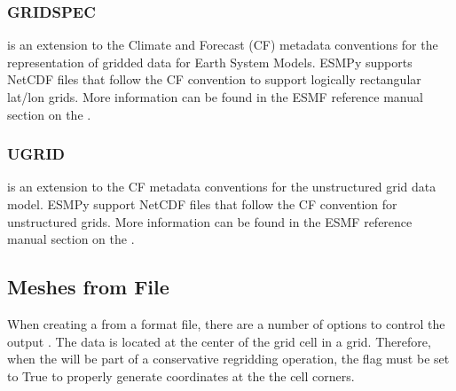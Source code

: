 \documentclass[letterpaper,10pt,english]{sphinxmanual}
\begin{document}
\subsubsection{GRIDSPEC}
\label{\detokenize{api:gridspec}}\label{\detokenize{api:id5}}
{\hyperref[\detokenize{FileFormat:ESMF.api.constants.FileFormat.GRIDSPEC}]{}} is an extension to the Climate and Forecast (CF) metadata
conventions for the representation of gridded data for Earth System
Models.  ESMPy supports NetCDF files that follow the CF {\hyperref[\detokenize{FileFormat:ESMF.api.constants.FileFormat.GRIDSPEC}]{}}
convention to support logically rectangular lat/lon grids.  More
information can be found in the ESMF reference manual section on the
.


\subsubsection{UGRID}
\label{\detokenize{api:ugrid}}\label{\detokenize{api:id6}}
{\hyperref[\detokenize{FileFormat:ESMF.api.constants.FileFormat.UGRID}]{}} is an extension to the CF metadata
conventions for the unstructured grid data model.  ESMPy support
NetCDF files that follow the CF {\hyperref[\detokenize{FileFormat:ESMF.api.constants.FileFormat.UGRID}]{}} convention for unstructured grids.
More information can be found in the ESMF reference manual section on
the .


\subsection{Meshes from File}
\label{\detokenize{api:meshes-from-file}}
When creating a {\hyperref[\detokenize{mesh:ESMF.api.mesh.Mesh}]{}} from a {\hyperref[\detokenize{FileFormat:ESMF.api.constants.FileFormat.SCRIP}]{}} format file, there are a number of
options to control the output {\hyperref[\detokenize{mesh:ESMF.api.mesh.Mesh}]{}}. The data is located at the center
of the grid cell in a {\hyperref[\detokenize{FileFormat:ESMF.api.constants.FileFormat.SCRIP}]{}} grid. Therefore, when the {\hyperref[\detokenize{mesh:ESMF.api.mesh.Mesh}]{}} will be
part of a conservative regridding operation, the 
flag must be set to True to properly generate coordinates at the the
cell corners.
\end{document}
